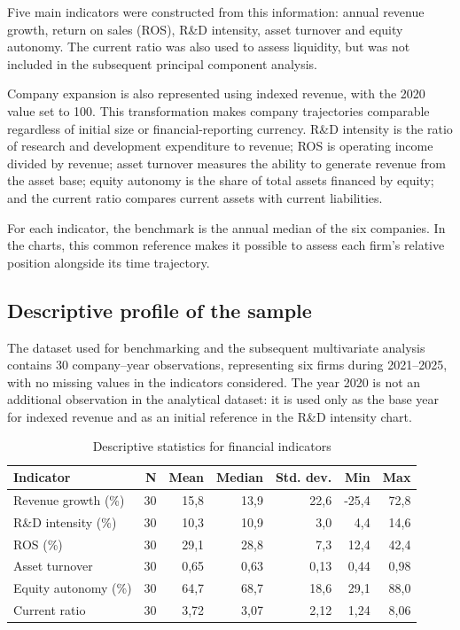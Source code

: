 \documentclass[11pt,a4paper]{article}
\begin{document}
Five main indicators were constructed from this information: annual revenue growth, return on sales (ROS), R\&D intensity, asset turnover and equity autonomy. The current ratio was also used to assess liquidity, but was not included in the subsequent principal component analysis.

Company expansion is also represented using indexed revenue, with the 2020 value set to 100. This transformation makes company trajectories comparable regardless of initial size or financial-reporting currency. R\&D intensity is the ratio of research and development expenditure to revenue; ROS is operating income divided by revenue; asset turnover measures the ability to generate revenue from the asset base; equity autonomy is the share of total assets financed by equity; and the current ratio compares current assets with current liabilities.

For each indicator, the benchmark is the annual median of the six companies. In the charts, this common reference makes it possible to assess each firm's relative position alongside its time trajectory.

\subsection{Descriptive profile of the sample}

The dataset used for benchmarking and the subsequent multivariate analysis contains 30 company--year observations, representing six firms during 2021--2025, with no missing values in the indicators considered. The year 2020 is not an additional observation in the analytical dataset: it is used only as the base year for indexed revenue and as an initial reference in the R\&D intensity chart.

\begin{table}[H]
\centering
\caption{Descriptive statistics for financial indicators}
\small
\begin{tabular}{lrrrrrr}
\toprule
\textbf{Indicator} & \textbf{N} & \textbf{Mean} & \textbf{Median} & \textbf{Std. dev.} & \textbf{Min} & \textbf{Max} \\
\midrule
Revenue growth (\%) & 30 & 15,8 & 13,9 & 22,6 & -25,4 & 72,8 \\
R\&D intensity (\%) & 30 & 10,3 & 10,9 & 3,0 & 4,4 & 14,6 \\
ROS (\%) & 30 & 29,1 & 28,8 & 7,3 & 12,4 & 42,4 \\
Asset turnover & 30 & 0,65 & 0,63 & 0,13 & 0,44 & 0,98 \\
Equity autonomy (\%) & 30 & 64,7 & 68,7 & 18,6 & 29,1 & 88,0 \\
Current ratio & 30 & 3,72 & 3,07 & 2,12 & 1,24 & 8,06 \\
\bottomrule
\end{tabular}
\end{table}
\end{document}
